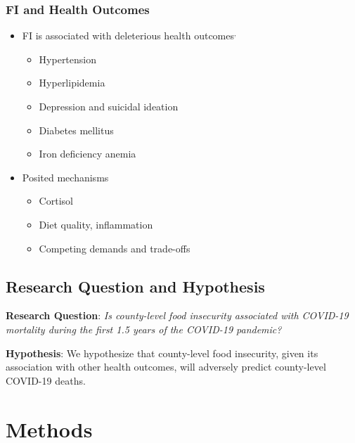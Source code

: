 \documentclass[aspectratio=169]{beamer}
\begin{document}
\begin{frame}
	\frametitle{FI and Health Outcomes}
	
	\begin{itemize}
		\item FI is associated with deleterious health outcomes$^{,}$
		\begin{itemize}
			\item Hypertension
			\item Hyperlipidemia
			\item Depression and suicidal ideation
			\item Diabetes mellitus
			\item Iron deficiency anemia
		\end{itemize}
		
		\item Posited mechanisms
		\begin{itemize}
			\item Cortisol
			\item Diet quality, inflammation
			\item Competing demands and trade-offs
		\end{itemize}
	\end{itemize}
\end{frame}

\subsection{Research Question and Hypothesis}

\begin{frame}
	
	\begin{center}
		\textbf{Research Question}: \textit{Is county-level food insecurity associated with COVID-19 mortality during the first 1.5 years of the COVID-19 pandemic?}\\
		
		\vspace{1.5cm}
		
		\textbf{Hypothesis}: We hypothesize that county-level food insecurity, given its association with other health outcomes, will adversely predict county-level COVID-19 deaths.
	\end{center}
\end{frame}

 \section{Methods}
\end{document}
